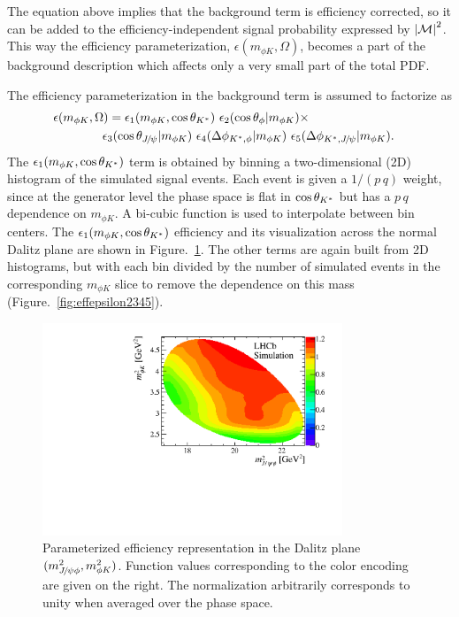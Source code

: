 The equation above implies that the background term is efficiency corrected,
so it can be added
to the efficiency-independent signal probability expressed by $\left|\mathcal{M}\right|^2$.
This way the efficiency parameterization, $\epsilon(m_{\phi K},\Omega)$, 
becomes a part of the background description which affects only a very small part 
of the total PDF.

The efficiency parameterization
in the background term is assumed to factorize as
\begin{equation}
\begin{split}
\lefteqn{\epsilon(m_{\phi K},\Omega)=\epsilon_1(m_{\phi K},\cosks)\,\,\epsilon_2(\cosphi|m_{\phi K})\times} \\%
&\quad\quad\quad\quad \epsilon_3(\cospsi|m_{\phi K})\,\, \epsilon_4(\phiksphi|m_{\phi K})\,\,\epsilon_5(\phikspsi|m_{\phi K}).
\end{split}
\label{eq:peff}
\end{equation}
The $\epsilon_1(m_{\phi K},\cos\theta_{{{K}^*}})$ term is obtained by binning 
a two-dimensional (2D) histogram of the simulated signal events. 
Each event is given a $1/(p\,q)$ weight, 
since at the generator level the phase space is flat in $\cos\theta_{{{K}^*}}$ 
but has a $p\,q$ dependence on $m_{\phi K}$.
A bi-cubic function is used to interpolate between bin centers.
The $\epsilon_1(m_{\phi K},\cos\theta_{{{K}^*}})$ efficiency and
its visualization across the normal Dalitz plane are shown in Figure.~\ref{fig:effm}.
The other terms are again built from 2D histograms, 
but with each bin divided by the number of simulated events in the corresponding 
$m_{\phi K}$ slice to remove the dependence on this mass (Figure.~\ref{fig:effepsilon2345}).

\begin{figure}[tbhp]
  \begin{center}
    \includegraphics[width=0.8\textwidth]{Figures/03_Zcs/05_Likelihood/effm1m2}
  \end{center}
  \vskip-0.3cm\caption{
     Parameterized efficiency representation in the Dalitz plane $({m_{{{J\mskip -3mu/\mskip -2mu\psi}}\phi}^2}, {m_{\phi{\ensuremath{K}}}^2})$.
     Function values corresponding to the color encoding are given on the right.
     The normalization arbitrarily corresponds to unity when averaged over the phase space.     
  \label{fig:effm}
  }
\end{figure}

